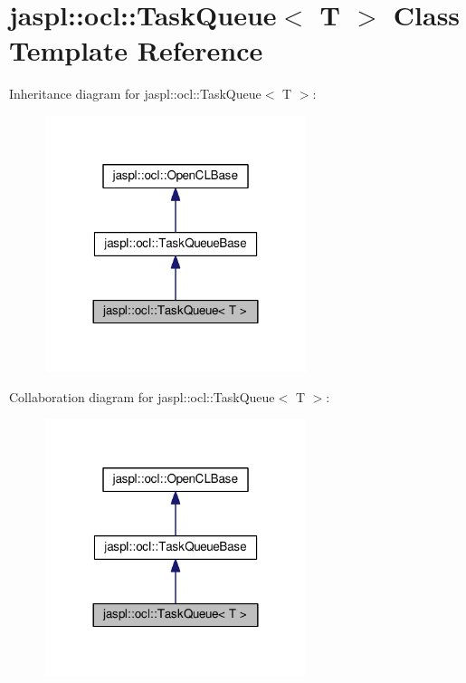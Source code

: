 \hypertarget{classjaspl_1_1ocl_1_1_task_queue}{}\section{jaspl\+:\+:ocl\+:\+:Task\+Queue$<$ T $>$ Class Template Reference}
\label{classjaspl_1_1ocl_1_1_task_queue}


Inheritance diagram for jaspl\+:\+:ocl\+:\+:Task\+Queue$<$ T $>$\+:\nopagebreak
\begin{figure}[H]
\begin{center}
\leavevmode
\includegraphics[width=216pt]{classjaspl_1_1ocl_1_1_task_queue__inherit__graph}
\end{center}
\end{figure}


Collaboration diagram for jaspl\+:\+:ocl\+:\+:Task\+Queue$<$ T $>$\+:\nopagebreak
\begin{figure}[H]
\begin{center}
\leavevmode
\includegraphics[width=216pt]{classjaspl_1_1ocl_1_1_task_queue__coll__graph}
\end{center}
\end{figure}
